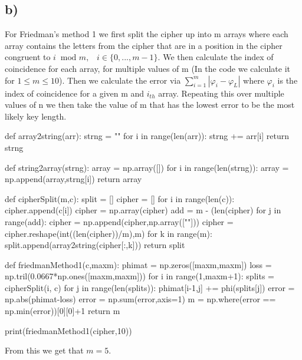 \documentclass{article}
\begin{document}
\subsection*{b)}
For Friedman's method 1 we first split the cipher up into m arrays where each array contains the letters from the cipher that are in a position in the cipher congruent to $i\;\;\text{mod }m,\;\;\;i\in\{0,...,m-1\}$. We then calculate the index of coincidence for each array, for multiple values of m (In the code we calculate it for $1\leq m\leq10$). Then we calculate the error via $\sum_{i=1}^{m}|\varphi_i-\varphi_L|$ where $\varphi_i$ is the index of coincidence for a given m and $i_{th}$ array. Repeating this over multiple values of n we then take the value of m that has the lowest error to be the most likely key length.
\begin{python}
def array2string(arr):
    strng = ""
    for i in range(len(arr)):
        strng += arr[i]
    return strng

def string2array(strng):
    array = np.array([])
    for i in range(len(strng)):
        array = np.append(array,strng[i])
    return array

def cipherSplit(m,c):
    split = []
    cipher = []
    for i in range(len(c)):
        cipher.append(c[i])
    cipher = np.array(cipher)
    add = m - (len(cipher)%
    for j in range(add):
        cipher = np.append(cipher,np.array([""]))
    cipher = cipher.reshape(int((len(cipher))/m),m)
    for k in range(m):
        split.append(array2string(cipher[:,k]))
    return split

def friedmanMethod1(c,maxm):
    phimat = np.zeros([maxm,maxm])
    loss = np.tril(0.0667*np.ones([maxm,maxm]))
    for i in range(1,maxm+1):
        splits = cipherSplit(i, c)
        for j in range(len(splits)):
            phimat[i-1,j] += phi(splits[j])
    error = np.abs(phimat-loss)
    error = np.sum(error,axis=1)
    m = np.where(error == np.min(error))[0][0]+1
    return m
            
print(friedmanMethod1(cipher,10))
\end{python}
From this we get that $m=5$.
\end{document}
